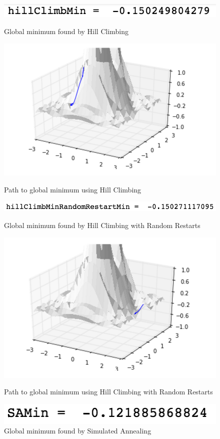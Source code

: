 \documentclass[a4paper]{article}
\begin{document}
\begin{figure}
\includegraphics[scale=0.5]{HC.png}
\caption{Global minimum found by Hill Climbing}
\includegraphics[scale=0.5]{hillClimbing.png}
\caption{Path to global minimum using Hill Climbing}
\includegraphics[scale=0.5]{RR.png}
\caption{Global minimum found by Hill Climbing with Random Restarts}
\includegraphics[scale=0.5]{random.png}
\caption{Path to global minimum using Hill Climbing with Random Restarts}
\includegraphics[scale=0.5]{SAM.png}
\caption{Global minimum found by Simulated Annealing}

\end{figure}
\end{document}
